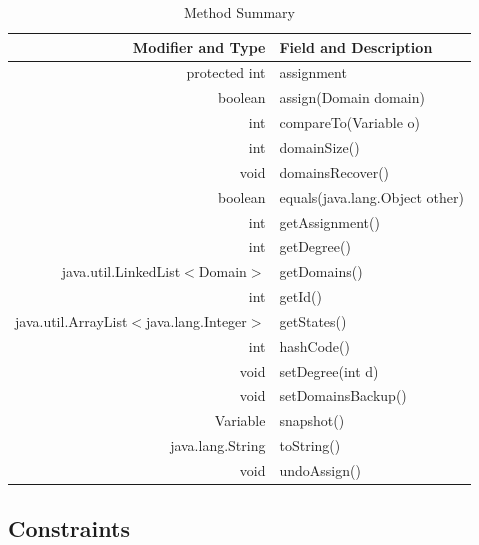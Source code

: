 \documentclass{article}
\begin{document}
\begin{table}[h]
\begin{center}
  \begin{tabular}{| r | l|  }
    \hline
    Modifier and Type & Field and Description \\ \hline
    protected int &	assignment                          \\ \hline
  boolean	&assign(Domain domain)                     \\ \hline
int&	compareTo(Variable o)                          \\ \hline
int	&domainSize()                                    \\ \hline
void&	domainsRecover()                               \\ \hline
boolean&	equals(java.lang.Object other)             \\ \hline
int	&getAssignment()                                 \\ \hline
int	&getDegree()                                     \\ \hline
java.util.LinkedList$<$Domain$>$	&getDomains()          \\ \hline
int&	getId()                                        \\ \hline
java.util.ArrayList$<$java.lang.Integer$>$&	getStates()  \\ \hline
int&	hashCode()                                     \\ \hline
void	&setDegree(int d)                              \\ \hline
void	&setDomainsBackup()                            \\ \hline
Variable	&snapshot()                                \\ \hline
java.lang.String&	toString()                         \\ \hline
void	&undoAssign()                                  \\ \hline
    \hline
  \end{tabular}
\caption{Method Summary}
\end{center}
\end{table}



	


\clearpage
\subsection{Constraints}
\end{document}
